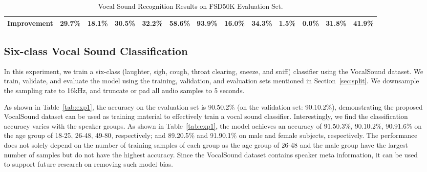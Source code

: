 \documentclass{article}
\newcommand{\squeezeup}{\vspace{-1.6mm}}
\begin{document}
\begin{table*}[t]
\begin{tabular}{@{}ccccccccccccc@{}}
Improvement                                                 & 29.7\%                                                 & \multicolumn{1}{c|}{18.1\%}                                                 & 30.5\%                                                 & \multicolumn{1}{c|}{32.2\%}                                                 & 58.6\%                                                 & \multicolumn{1}{c|}{93.9\%}                                                 & 16.0\%                                                 & \multicolumn{1}{c|}{34.3\%}                                                 & 1.5\%                                                  & \multicolumn{1}{c|}{0.0\%}                                                  & 31.8\%                                                 & 41.9\%                                                 \\ \bottomrule
\end{tabular}
\caption{Vocal Sound Recognition Results on FSD50K Evaluation Set.}
\label{tab:exp2}
\squeezeup
\end{table*}


\subsection{Six-class Vocal Sound Classification}
\label{sec:exp1}

In this experiment, we train a six-class (laughter, sigh, cough, throat clearing, sneeze, and sniff) classifier using the VocalSound dataset. We train, validate, and evaluate the model using the training, validation, and evaluation sets mentioned in Section~\ref{sec:split}. We downsample the sampling rate to 16kHz, and truncate or pad all audio samples to 5 seconds. 

As shown in Table~\ref{tab:exp1}, the accuracy on the evaluation set is 90.50.2\% (on the validation set: 90.10.2\%), demonstrating the proposed VocalSound dataset can be used as training material to effectively train a vocal sound classifier. Interestingly, we find the classification accuracy varies with the speaker groups. As shown in Table~\ref{tab:exp1}, the model achieves an accuracy of 91.50.3\%, 90.10.2\%, 90.91.6\% on the age group of 18-25, 26-48, 49-80, respectively; and 89.20.5\% and 91.90.1\% on male and female subjects, respectively. The performance does not solely depend on the number of training samples of each group as the age group of 26-48 and the male group have the largest number of samples but do not have the highest accuracy. Since the VocalSound dataset contains speaker meta information, it can be used to support future research on removing such model bias.
\end{document}
